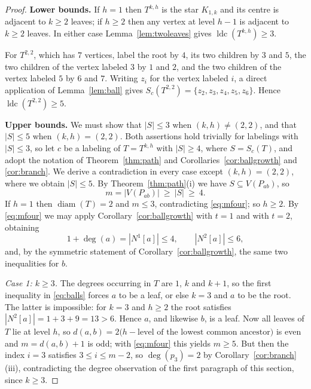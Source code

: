 \documentclass[reqno,10pt]{article}
\theoremstyle{definition}
\numberwithin{equation}{section}
\numberwithin{theorem}{section}
\newcommand{\ldc}{\operatorname{ldc}}
\newcommand{\diam}{\operatorname{diam}}
\newcommand{\Ball}[2]{N^{#2}[#1]}
\newcommand{\Tkh}{T^{k,h}}
\begin{document}
\begin{proof}
\smallskip
\textbf{Lower bounds.} If $h=1$ then $\Tkh$ is the star $K_{1,k}$ and its
centre is adjacent to $k\ge2$ leaves; if $h\ge2$ then any vertex at level $h-1$
is adjacent to $k\ge2$ leaves. In either case Lemma~\ref{lem:twoleaves} gives
$\ldc(\Tkh)\ge3$.

For $T^{2,2}$, which has $7$ vertices, label the root by $4$, its two children
by $3$ and $5$, the two children of the vertex labeled $3$ by $1$ and $2$, and
the two children of the vertex labeled $5$ by $6$ and $7$. Writing $z_i$ for
the vertex labeled $i$, a direct application of Lemma~\ref{lem:ball} gives
$S_c(T^{2,2})=\{z_2,z_3,z_4,z_5,z_6\}$. Hence $\ldc(T^{2,2})\ge5$.

\smallskip
\textbf{Upper bounds.} We must show that $|S|\le3$ when $(k,h)\ne(2,2)$, and
that $|S|\le5$ when $(k,h)=(2,2)$. Both assertions hold trivially for labelings
with $|S|\le3$, so let $c$ be a labeling of $T=\Tkh$ with $|S|\ge4$, where
$S=S_c(T)$, and adopt the notation of Theorem~\ref{thm:path} and
Corollaries~\ref{cor:ballgrowth} and \ref{cor:branch}. We derive a
contradiction in every case except $(k,h)=(2,2)$, where we obtain $|S|\le5$.
By Theorem~\ref{thm:path}(i) we have $S\subseteq V(P_{ab})$, so
\begin{equation}
  m=|V(P_{ab})|\ \ge\ |S|\ \ge\ 4 .
  \label{eq:mfour}
\end{equation}
If $h=1$ then $\diam(T)=2$ and $m\le3$, contradicting \eqref{eq:mfour}; so
$h\ge2$. By \eqref{eq:mfour} we may apply Corollary~\ref{cor:ballgrowth} with
$t=1$ and with $t=2$, obtaining
\begin{equation}
  1+\deg(a)=|\Ball{a}{1}|\le4,
  \qquad
  |\Ball{a}{2}|\le6,
  \label{eq:balls}
\end{equation}
and, by the symmetric statement of Corollary~\ref{cor:ballgrowth}, the same two
inequalities for $b$.

\smallskip
\emph{Case 1: $k\ge3$.} The degrees occurring in $T$ are $1$, $k$ and $k+1$, so
the first inequality in \eqref{eq:balls} forces $a$ to be a leaf, or else $k=3$
and $a$ to be the root. The latter is impossible: for $k=3$ and $h\ge2$ the
root satisfies $|\Ball{a}{2}|=1+3+9=13>6$. Hence $a$, and likewise $b$, is a
leaf. Now all leaves of $T$ lie at level $h$, so
$d(a,b)=2\bigl(h-\text{level of the lowest common ancestor}\bigr)$ is even and
$m=d(a,b)+1$ is odd; with \eqref{eq:mfour} this yields $m\ge5$. But then the
index $i=3$ satisfies $3\le i\le m-2$, so $\deg(p_3)=2$ by
Corollary~\ref{cor:branch}(iii), contradicting the degree observation of the
first paragraph of this section, since $k\ge3$.


\end{proof}
\end{document}
